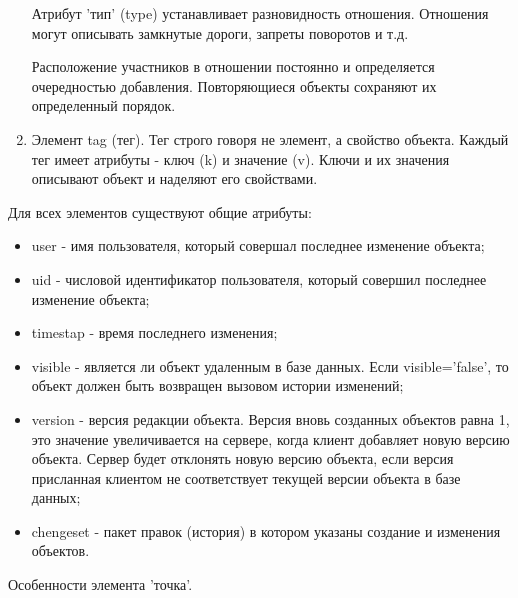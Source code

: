 \documentclass[12pt,a4paper,oneside]{article} %
\begin{document}
\begin{enumerate}
    Атрибут 'тип' (type) устанавливает разновидность отношения. \linebreak
    Отношения могут описывать замкнутые дороги, запреты поворотов и т.д.

    Расположение участников в отношении постоянно и определяется \linebreak
    очередностью добавления. Повторяющиеся объекты сохраняют их \linebreak
    определенный порядок.

\item Элемент tag (тег). Тег строго говоря не элемент, а свойство объекта. \linebreak
Каждый тег имеет атрибуты - ключ (k) и значение (v). Ключи и их \linebreak
значения описывают объект и наделяют его свойствами.
\end{enumerate}

Для всех элементов существуют общие атрибуты:

\begin{itemize}
\item user - имя пользователя, который совершал последнее изменение \linebreak
объекта;
\item uid - числовой идентификатор пользователя, который совершил \linebreak
последнее изменение объекта;
\item timestap - время последнего изменения;
\item visible - является ли объект удаленным в базе данных. Если visible='false', \linebreak
то объект должен быть возвращен вызовом истории изменений;
\item version - версия редакции объекта. Версия вновь созданных объектов \linebreak
равна 1, это значение увеличивается на сервере, когда клиент добавляет \linebreak
новую версию объекта. Сервер будет отклонять новую версию объекта, если \linebreak
версия присланная клиентом не соответствует текущей версии объекта в \linebreak
базе данных;
\item chengeset - пакет правок (история) в котором указаны создание и \linebreak
изменения объектов.
\end{itemize}

Особенности элемента 'точка'.
\end{document}
